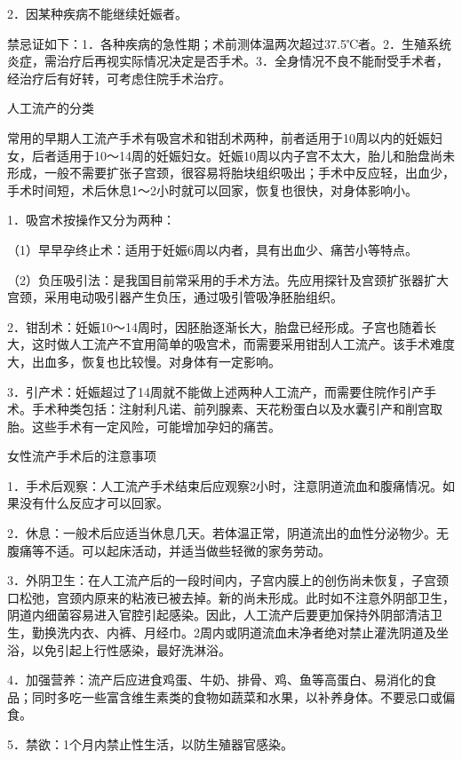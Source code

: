 \documentclass[12pt,UTF8,openany]{ctexbook}
\begin{document}
2．因某种疾病不能继续妊娠者。

禁忌证如下：1．各种疾病的急性期；术前测体温两次超过37.5℃者。2．生殖系统炎症，需治疗后再视实际情况决定是否手术。3．全身情况不良不能耐受手术者，经治疗后有好转，可考虑住院手术治疗。





人工流产的分类


常用的早期人工流产手术有吸宫术和钳刮术两种，前者适用于10周以内的妊娠妇女，后者适用于10～14周的妊娠妇女。妊娠10周以内子宫不太大，胎儿和胎盘尚未形成，一般不需要扩张子宫颈，很容易将胎块组织吸出；手术中反应轻，出血少，手术时间短，术后休息1～2小时就可以回家，恢复也很快，对身体影响小。

1．吸宫术按操作又分为两种：

（1）早早孕终止术：适用于妊娠6周以内者，具有出血少、痛苦小等特点。

（2）负压吸引法：是我国目前常采用的手术方法。先应用探针及宫颈扩张器扩大宫颈，采用电动吸引器产生负压，通过吸引管吸净胚胎组织。

2．钳刮术：妊娠10～14周时，因胚胎逐渐长大，胎盘已经形成。子宫也随着长大，这时做人工流产不宜用简单的吸宫术，而需要采用钳刮人工流产。该手术难度大，出血多，恢复也比较慢。对身体有一定影响。

3．引产术：妊娠超过了14周就不能做上述两种人工流产，而需要住院作引产手术。手术种类包括：注射利凡诺、前列腺素、天花粉蛋白以及水囊引产和削宫取胎。这些手术有一定风险，可能增加孕妇的痛苦。





女性流产手术后的注意事项


1．手术后观察：人工流产手术结束后应观察2小时，注意阴道流血和腹痛情况。如果没有什么反应才可以回家。

2．休息：一般术后应适当休息几天。若体温正常，阴道流出的血性分泌物少。无腹痛等不适。可以起床活动，并适当做些轻微的家务劳动。

3．外阴卫生：在人工流产后的一段时间内，子宫内膜上的创伤尚未恢复，子宫颈口松弛，宫颈内原来的粘液已被去掉。新的尚未形成。此时如不注意外阴部卫生，阴道内细菌容易进入官腔引起感染。因此，人工流产后要更加保持外阴部清洁卫生，勤换洗内衣、内裤、月经巾。2周内或阴道流血未净者绝对禁止灌洗阴道及坐浴，以免引起上行性感染，最好洗淋浴。

4．加强营养：流产后应进食鸡蛋、牛奶、排骨、鸡、鱼等高蛋白、易消化的食品；同时多吃一些富含维生素类的食物如蔬菜和水果，以补养身体。不要忌口或偏食。

5．禁欲：1个月内禁止性生活，以防生殖器官感染。
\end{document}
